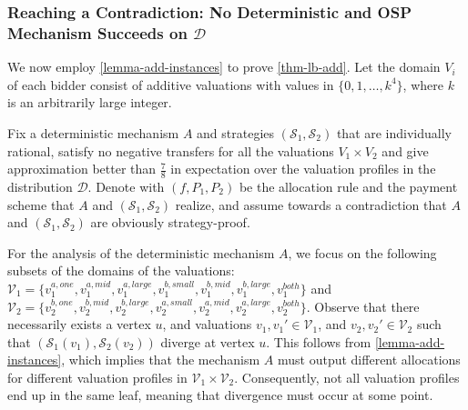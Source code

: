 \subsubsection[Reaching a Contradiction: No Deterministic and OSP Mechanism Succeeds on D]{Reaching a Contradiction: No Deterministic and OSP Mechanism Succeeds on $\mathcal D$}
\label{subsubsec-contradiction-add}
We now employ \cref{lemma-add-instances} to prove  \cref{thm-lb-add}. Let the domain $V_i$ of each bidder consist 
of additive valuations with values in  $\{0,1,\ldots,k^4\}$, where $k$ is an arbitrarily large integer. 


Fix a deterministic mechanism $A$ and strategies
$(\mathcal S_1,\mathcal S_2)$ that are individually rational, satisfy no negative transfers for all the valuations  $V_1\times V_2$ and give approximation better than $\frac{7}{8}$
in expectation over the valuation profiles in the distribution $\mathcal D$. 
Denote with  $(f,P_1,P_2)$ be the allocation rule and the payment scheme that $A$ and $(\mathcal S_1,\mathcal S_2)$ realize, and assume towards a contradiction that $A$ and $(\mathcal S_1,\mathcal S_2)$ are obviously strategy-proof. 


For the analysis of the deterministic mechanism $A$, we focus on the following subsets of the domains of the valuations:
$
\mathcal{V}_1=\{v_1^{a,one},v_1^{a,mid},v_1^{a,large},v_1^{b,small},v_1^{b,mid},v_1^{b,large},v_1^{both}\}$ and  $\mathcal V_2=\{v_2^{b,one},v_2^{b,mid},v_2^{b,large},\allowbreak v_2^{a,small},v_2^{a,mid}, \allowbreak v_2^{a,large},v_2^{both}\}$.
Observe that there necessarily exists a vertex $u$, and valuations $v_1,v_1' \in \mathcal{V}_1$, and  $v_2,v_2' \in \mathcal{V}_2$ such that $(\mathcal{S}_1(v_1), \mathcal{S}_2(v_2))$ diverge at vertex $u$. This follows from \cref{lemma-add-instances}, which implies that the mechanism $A$ must output different allocations for different valuation profiles in $\mathcal{V}_1 \times \mathcal{V}_2$. Consequently, not all valuation profiles end up in the same leaf, meaning that divergence must occur at some point.

